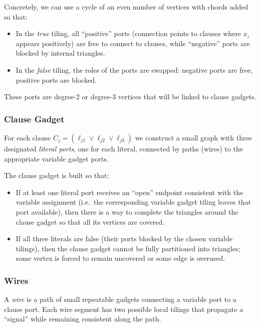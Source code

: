 \documentclass[9pt]{extarticle}
\begin{document}
Concretely, we can use a cycle of an even number of vertices with chords added
so that:
\begin{itemize}
    \item In the \emph{true} tiling, all “positive” ports (connection points to
          clauses where $x_i$ appears positively) are free to connect to clauses,
          while “negative” ports are blocked by internal triangles.
    \item In the \emph{false} tiling, the roles of the ports are swapped:
          negative ports are free, positive ports are blocked.
\end{itemize}

These ports are degree-2 or degree-3 vertices that will be linked to clause
gadgets.

\subsubsection*{Clause Gadget}

For each clause $C_j = (\ell_{j1} \lor \ell_{j2} \lor \ell_{j3})$ we construct a
small graph with three designated \emph{literal ports}, one for each literal,
connected by paths (wires) to the appropriate variable gadget ports.

The clause gadget is built so that:
\begin{itemize}
    \item If at least one literal port receives an ``open'' endpoint consistent
          with the variable assignment (i.e.\ the corresponding variable gadget
          tiling leaves that port available), then there is a way to complete
          the triangles around the clause gadget so that all its vertices are
          covered.
    \item If all three literals are false (their ports blocked by the chosen
          variable tilings), then the clause gadget cannot be fully partitioned
          into triangles; some vertex is forced to remain uncovered or some edge
          is overused.
\end{itemize}

\subsubsection*{Wires}

A \emph{wire} is a path of small repeatable gadgets connecting a variable port
to a clause port.  Each wire segment has two possible local tilings that
propagate a “signal” while remaining consistent along the path.
\end{document}
